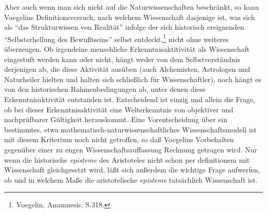 Aber auch wenn man sich nicht auf die Naturwissenschaften beschränkt, so kann
Voegelins Definitionsversuch, nach welchem Wissenschaft dasjenige ist, was
sich als "`das Strukturwissen von Realität"' infolge der sich historisch
ereignenden "`Selbsterhellung des Bewußtseins"' selbst
entdeckt,\footnote{Voegelin, Anamnesis, S.318.} nicht ohne weiteres
überzeugen. Ob irgendeine menschliche Erkenntnisaktitivität als Wissenschaft
eingestuft werden kann oder nicht, hängt weder von dem Selbstverständnis
derjenigen ab, die diese Aktivität ausüben (auch Alchemisten, Astrologen und
Naturheiler hielten und halten sich schließlich für Wissenschaftler), noch
hängt es von den historischen Rahmenbedingungen ab, unter denen diese
Erkenntnisaktivität entstanden ist. Entscheidend ist einzig und allein die
Frage, ob bei dieser Erkenntnisaktivität eine Welterkenntnis von objektiver
und nachprüfbarer Gültigkeit herauskommt. Eine Vorentscheidung über ein
bestimmtes, etwa mathematisch-naturwissenschaftliches Wissenschaftsmodell ist
mit diesem Kriterium noch nicht getroffen, so daß Voegelins Vorbehalten
gegenüber einer zu engen Wissenschaftsauffassung Rechnung getragen wird. Nur
wenn die historische {\it episteme} des Aristoteles nicht schon per
definitionem mit Wissenschaft gleichgesetzt wird, läßt sich außerdem die
wichtige Frage aufwerfen, ob und in welchem Maße die aristotelische {\it
  episteme} tatsächlich Wissenschaft ist.


